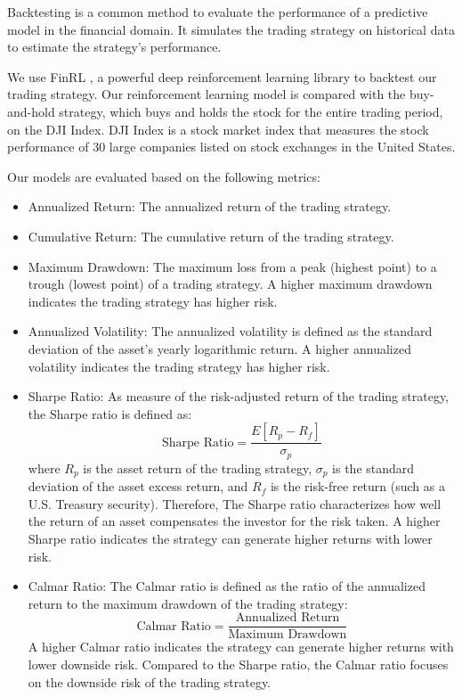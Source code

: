 \documentclass[conference]{IEEEtran}
\begin{document}
Backtesting is a common method to evaluate the performance of a predictive model in the financial domain.
It simulates the trading strategy on historical data to estimate the strategy's performance.

We use FinRL \cite{liu2022finrldeepreinforcementlearning}, a powerful deep reinforcement learning library to backtest our trading strategy.
Our reinforcement learning model is compared with the buy-and-hold strategy, which buys and holds the stock for the entire trading period, on the DJI Index.
DJI Index is a stock market index that measures the stock performance of 30 large companies listed on stock exchanges in the United States.

Our models are evaluated based on the following metrics:
\begin{itemize}
  \item Annualized Return: The annualized return of the trading strategy.
  \item Cumulative Return: The cumulative return of the trading strategy.
  \item Maximum Drawdown: The maximum loss from a peak (highest point) to a trough (lowest point) of a trading strategy.
  A higher maximum drawdown indicates the trading strategy has higher risk.
  \item Annualized Volatility: The annualized volatility is defined as the standard deviation of the asset's yearly logarithmic return.
  A higher annualized volatility indicates the trading strategy has higher risk.
  \item Sharpe Ratio: As measure of the risk-adjusted return of the trading strategy, the Sharpe ratio is defined as:
    \begin{equation}
      \text{Sharpe Ratio} = \frac{E[R_p - R_f]}{\sigma_p}
    \end{equation}
    where $R_p$ is the asset return of the trading strategy, $\sigma_p$ is the standard deviation of the asset excess return, and $R_f$ is the risk-free return (such as a U.S. Treasury security).
    Therefore, The Sharpe ratio characterizes how well the return of an asset compensates the investor for the risk taken.
    A higher Sharpe ratio indicates the strategy can generate higher returns with lower risk.
  \item Calmar Ratio:
    The Calmar ratio is defined as the ratio of the annualized return to the maximum drawdown of the trading strategy:
    \begin{equation}
      \text{Calmar Ratio} = \frac{\text{Annualized Return}}{\text{Maximum Drawdown}}
    \end{equation}
    A higher Calmar ratio indicates the strategy can generate higher returns with lower downside risk.
    Compared to the Sharpe ratio, the Calmar ratio focuses on the downside risk of the trading strategy.
 

\end{itemize}
\end{document}
